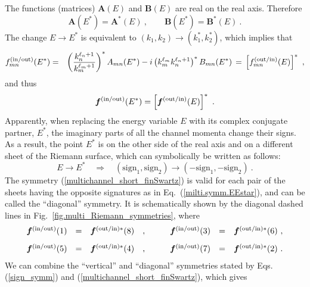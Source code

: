 \documentclass[12pt]{article}
\begin{document}
The functions (matrices) $\bm{A}(E)$ and $\bm{B}(E)$ are real on the real
axis\cite{our.MultiCh, our_Coulomb}.  Therefore
\begin{equation}
\label{multichannel_short_Schwartz}
    \bm{A}(E^*)=\bm{A}^*(E)\ ,
    \qquad
    \bm{B}(E^*)=\bm{B}^*(E)\ .
\end{equation}
The change $E\to E^*$ is equivalent to $(k_1,k_2)\to(k_1^*,k_2^*)$,
which implies that
\begin{eqnarray*}
   f_{mn}^{\rm(in/out)}(E^*)
   &=&
   \left(\frac{k_n^{\ell_n+1}}{k_m^{\ell_m+1}}\right)^*
   A_{mn}(E^*)-
   i\left(k_m^{\ell_m}k_n^{\ell_n+1}\right)^*
   B_{mn}(E^*)\,=\,\left[f_{mn}^{\rm(out/in)}(E)\right]^*\ ,
\end{eqnarray*}
and thus
\begin{equation}
\label{multichannel_short_finSwartz}
   \bm{f}^{\rm(in/out)}(E^*)=\left[\bm{f}^{\rm(out/in)}(E)\right]^*\ .
\end{equation}
Apparently, when replacing the energy variable $E$ with its complex conjugate 
partner, $E^*$, the imaginary parts of 
all the channel momenta change their signs. As a result, the point $E^*$ is on 
the other side of the real axis and on a different sheet of the Riemann 
surface, which can symbolically be written as 
follows:
\begin{equation}
\label{milti.symm.EEstar}
   E\to E^*\quad\Rightarrow\quad
   (\mathrm{sign}_1,\mathrm{sign}_2)\to
   (-\mathrm{sign}_1,-\mathrm{sign}_2)\ .
\end{equation}
The symmetry  (\ref{multichannel_short_finSwartz}) is valid for each pair of the 
sheets having the opposite signatures as in Eq.~(\ref{milti.symm.EEstar}),
and can be called the ``diagonal'' symmetry. It is schematically shown by the 
diagonal dashed lines in Fig.~\ref{fig.multi_Riemann_symmetries}, where
\begin{equation}
\label{diag_symm_example}
\begin{array}{rcllrcl}
      \bm{f}^{\rm (in/out)}(1) &=&
      \bm{f}^{\rm (out/in)*}(8)&,&
      \qquad
      \bm{f}^{\rm (in/out)}(3) &=&
      \bm{f}^{\rm (out/in)*}(6)\ ,\\[3mm]
      \bm{f}^{\rm (in/out)}(5) &=&
      \bm{f}^{\rm (out/in)*}(4)&,&
      \qquad
      \bm{f}^{\rm (in/out)}(7) &=&
      \bm{f}^{\rm (out/in)*}(2)\ .
\end{array}
\end{equation}
We can combine the ``vertical'' and ``diagonal'' symmetries stated by Eqs.
(\ref{sign_symm}) and (\ref{multichannel_short_finSwartz}), which gives
\end{document}
